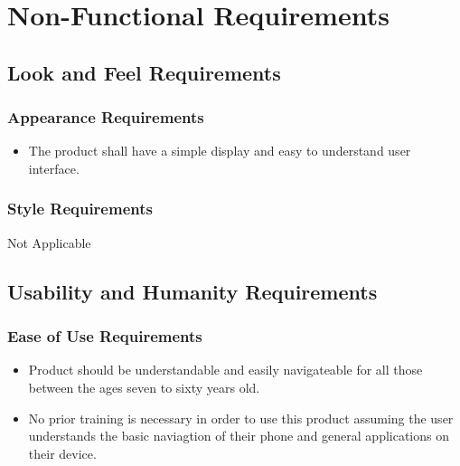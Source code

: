 \documentclass[]{article}
\begin{document}

\section{Non-Functional Requirements}
\label{sec:non-functional_requirements}
\subsection{Look and Feel Requirements}
\label{sub:look_and_feel_requirements}

\subsubsection{Appearance Requirements}
\label{ssub:appearance_requirements}
\begin{itemize}
	\item The product shall have a simple display and easy to understand user interface.
\end{itemize}

\subsubsection{Style Requirements}
\label{ssub:style_requirements}
	 Not Applicable


\subsection{Usability and Humanity Requirements}
\label{sub:usability_and_humanity_requirements}

\subsubsection{Ease of Use Requirements}
\label{ssub:ease_of_use_requirements}
\begin{itemize}
	\item Product should be understandable and easily navigateable for all those between the ages seven to sixty years old.
	\item No prior training is necessary in order to use this product assuming the user understands the basic naviagtion of their phone and general applications on their device.
\end{itemize}
\end{document}
